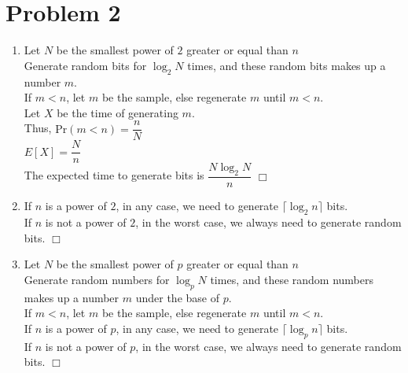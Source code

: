 \documentclass[12pt]{article}
\def\qed{\hfill\mbox{$\Box$}}
\begin{document}
\section*{Problem 2}
\begin{enumerate}[(1)]
\item
	Let $N$ be the smallest power of $2$ greater or equal than $n$\\
	Generate random bits for $\log_2N$ times, and these random bits makes up a number $m$.\\
	If $m<n$, let $m$ be the sample, else regenerate $m$ until $m<n$.\\
	Let $X$ be the time of generating $m$.\\
	Thus, $\mathrm{Pr}(m<n)=\dfrac{n}{N}$\\
	$E[X]=\dfrac{N}{n}$\\
	The expected time to generate bits is $\dfrac{N\log_2N}{n}$
	\qed
\item
	If $n$ is a power of $2$, in any case, we need to generate $\lceil\log_2n\rceil$ bits.\\
	If $n$ is not a power of $2$, in the worst case, we always need to generate random bits.
	\qed
\item
	Let $N$ be the smallest power of $p$ greater or equal than $n$\\
	Generate random numbers for $\log_p N$ times, and these random numbers makes up a number $m$ under the base of $p$.\\
	If $m<n$, let $m$ be the sample, else regenerate $m$ until $m<n$.\\

	If $n$ is a power of $p$, in any case, we need to generate $\lceil\log_pn\rceil$ bits.\\
	If $n$ is not a power of $p$, in the worst case, we always need to generate random bits.
	\qed
\end{enumerate}
\end{document}
